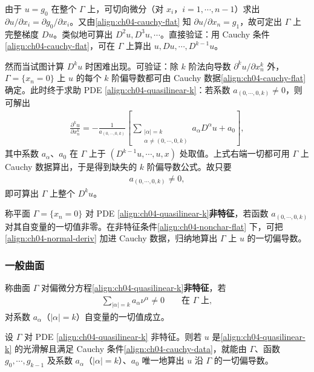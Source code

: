 \documentclass[../../main.tex]{subfiles}
\begin{document}
由于 $u=g_0$ 在整个 $\Gamma$ 上，可切向微分（对 $x_i$，$i=1,\cdots,n-1$）求出 $\partial u/\partial x_i=\partial g_0/\partial x_i$。又由\eqref{align:ch04-cauchy-flat} 知 $\partial u/\partial x_n=g_1$，故可定出 $\Gamma$ 上完整梯度 $Du$。类似地可算出 $D^2u,D^3u,\cdots$。直接验证：用 Cauchy 条件\eqref{align:ch04-cauchy-flat}，可在 $\Gamma$ 上算出 $u,Du,\cdots,D^{k-1}u$。

然而当试图计算 $D^ku$ 时困难出现。可验证：除 $k$ 阶法向导数 $\partial^k u/\partial x_n^k$ 外，$\Gamma=\{x_n=0\}$ 上 $u$ 的每个 $k$ 阶偏导数都可由 Cauchy 数据\eqref{align:ch04-cauchy-flat} 确定。此时终于求助 PDE \eqref{align:ch04-quasilinear-k}：若系数 $a_{(0,\cdots,0,k)}\neq 0$，则可解出
\begin{align}\label{align:ch04-normal-deriv}
\frac{\partial^k u}{\partial x_n^k}=-\frac{1}{a_{(0,\cdots,0,k)}}\left[\sum_{\substack{|\alpha|=k\\\alpha\neq(0,\cdots,0,k)}}a_\alpha D^\alpha u+a_0\right],
\end{align}
其中系数 $a_\alpha$、$a_0$ 在 $\Gamma$ 上于 $(D^{k-1}u,\cdots,u,x)$ 处取值。上式右端一切都可用 $\Gamma$ 上 Cauchy 数据算出，于是得到缺失的 $k$ 阶偏导数公式。故只要
\begin{align}\label{align:ch04-nonchar-flat}
a_{(0,\cdots,0,k)}\neq 0,
\end{align}
即可算出 $\Gamma$ 上整个 $D^ku$。

称平面 $\Gamma=\{x_n=0\}$ 对 PDE \eqref{align:ch04-quasilinear-k}\textbf{非特征}，若函数 $a_{(0,\cdots,0,k)}$ 对其自变量的一切值非零。在非特征条件\eqref{align:ch04-nonchar-flat} 下，可把\eqref{align:ch04-normal-deriv} 加进 Cauchy 数据，归纳地算出 $\Gamma$ 上 $u$ 的一切偏导数。

\subsubsection{一般曲面}

\begin{definition}\label{definition:ch04-noncharacteristic}
称曲面 $\Gamma$ 对偏微分方程\eqref{align:ch04-quasilinear-k}\textbf{非特征}，若
\begin{align}\label{align:ch04-nonchar-general}
\sum_{|\alpha|=k}a_\alpha\nu^\alpha\neq 0 \qquad\text{在 }\Gamma\text{ 上},
\end{align}
对系数 $a_\alpha$（$|\alpha|=k$）自变量的一切值成立。
\end{definition}

\begin{theorem}\label{theorem:ch04-cauchy-nonchar}设 $\Gamma$ 对 PDE \eqref{align:ch04-quasilinear-k} 非特征。则若 $u$ 是\eqref{align:ch04-quasilinear-k} 的光滑解且满足 Cauchy 条件\eqref{align:ch04-cauchy-data}，就能由 $\Gamma$、函数 $g_0,\cdots,g_{k-1}$ 及系数 $a_\alpha$（$|\alpha|=k$）、$a_0$ 唯一地算出 $u$ 沿 $\Gamma$ 的一切偏导数。
\end{theorem}
\end{document}
